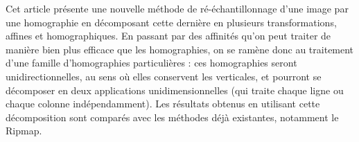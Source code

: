 
Cet article présente une nouvelle méthode de ré-échantillonnage d'une image par une homographie en décomposant cette dernière en plusieurs transformations, affines et homographiques. En passant par des affinités qu'on peut traiter de manière bien plus efficace que les homographies, on se ramène donc au traitement d'une famille d'homographies particulières : ces homographies seront unidirectionnelles, au sens où elles conservent les verticales, et pourront se décomposer en deux applications unidimensionnelles (qui traite chaque ligne ou chaque colonne indépendamment). Les résultats obtenus en utilisant cette décomposition sont comparés avec les méthodes déjà existantes, notamment le Ripmap.
